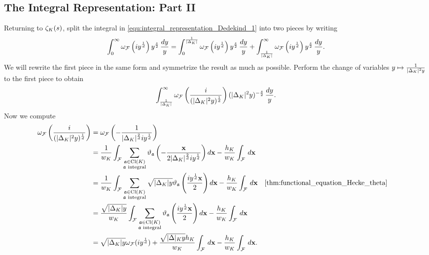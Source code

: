     \subsection*{The Integral Representation: Part II}
      Returning to $\zeta_{K}(s)$, split the integral in \cref{equ:integral_representation_Dedekind_1} into two pieces by writing
      \begin{equation}\label{equ:symmetric_integral_Dedekind_L-functions_split}
        \int_{0}^{\infty}\omega_{\mathcal{F}}\left(iy^{\frac{1}{d}}\right)y^{\frac{s}{2}}\,\frac{dy}{y} = \int_{0}^{\frac{1}{|\Delta_{K}|}}\omega_{\mathcal{F}}\left(iy^{\frac{1}{d}}\right)y^{\frac{s}{2}}\,\frac{dy}{y}+\int_{\frac{1}{|\Delta_{K}|}}^{\infty}\omega_{\mathcal{F}}\left(iy^{\frac{1}{d}}\right)y^{\frac{s}{2}}\,\frac{dy}{y}.
      \end{equation}
      We will rewrite the first piece in the same form and symmetrize the result as much as possible. Perform the change of variables $y \mapsto \frac{1}{|\Delta_{K}|^{2}y}$ to the first piece to obtain
      \[
        \int_{\frac{1}{|\Delta_{K}|}}^{\infty}\omega_{\mathcal{F}}\left(\frac{i}{(|\Delta_{K}|^{2}y)^{\frac{1}{d}}}\right)(|\Delta_{K}|^{2}y)^{-\frac{s}{2}}\,\frac{dy}{y}.
      \]
      Now we compute
      \begin{align*}
        \w_{\mc{F}}\left(\frac{i}{(|\D_{K}|^{2}y)^{\frac{1}{d}}}\right) &= \w_{\mc{F}}\left(-\frac{1}{|\D_{K}|^{\frac{2}{d}}iy^{\frac{1}{d}}}\right) \\
        &= \frac{1}{w_{K}}\int_{\mc{F}}\sum_{\substack{\mf{a} \in \Cl(K) \\ \text{$\mf{a}$ integral}}}\vt_{\mf{a}}\left(-\frac{\mathbf{x}}{2|\D_{K}|^{\frac{2}{d}}iy^{\frac{1}{d}}}\right)d\mathbf{x}-\frac{h_{K}}{w_{K}}\int_{\mc{F}}\,d\mathbf{x} \\
        &= \frac{1}{w_{K}}\int_{\mc{F}}\sum_{\substack{\mf{a} \in \Cl(K) \\ \text{$\mf{a}$ integral}}}\sqrt{|\D_{K}|y}\vt_{\mf{a}}\left(\frac{iy^{\frac{1}{d}}\mathbf{x}}{2}\right)d\mathbf{x}-\frac{h_{K}}{w_{K}}\int_{\mc{F}}\,d\mathbf{x} && \text{\cref{thm:functional_equation_Hecke_theta}} \\
        &= \frac{\sqrt{|\D_{K}|y}}{w_{K}}\int_{\mc{F}}\sum_{\substack{\mf{a} \in \Cl(K) \\ \text{$\mf{a}$ integral}}}\vt_{\mf{a}}\left(\frac{iy^{\frac{1}{d}}\mathbf{x}}{2}\right)d\mathbf{x}-\frac{h_{K}}{w_{K}}\int_{\mc{F}}\,d\mathbf{x} \\
        &= \sqrt{|\D_{K}|y}\w_{\mc{F}}(iy^{\frac{1}{d}})+\frac{\sqrt{|\D|_{K}y}h_{K}}{w_{K}}\int_{\mc{F}}\,d\mathbf{x}-\frac{h_{K}}{w_{K}}\int_{\mc{F}}\,d\mathbf{x}.
      \end{align*}
